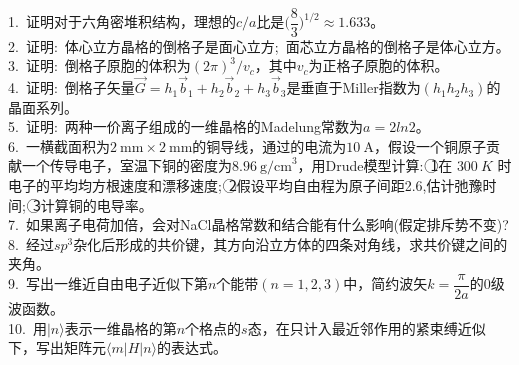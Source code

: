 \vskip 5pt
\\
1.~证明对于六角密堆积结构，理想的$c/a$比是$\bigg(\dfrac83\bigg)^{1/2}\approx1.633$。\\
2.~证明:~体心立方晶格的倒格子是面心立方;~面芯立方晶格的倒格子是体心立方。\\
3.~证明:~倒格子原胞的体积为$(2\pi)^3/v_c$，其中$v_c$为正格子原胞的体积。\\
4.~证明:~倒格子矢量$\vec G=h_1\vec b_1+h_2\vec b_2+h_3\vec b_3$是垂直于\textrm{Miller}指数为$(h_1h_2h_3)$的晶面系列。\\
5.~证明:~两种一价离子组成的一维晶格的\textrm{Madelung}常数为$a=2ln2$。\\
6.~一横截面积为$2~\mathrm{mm}\times2~\mathrm{mm}$的铜导线，通过的电流为$10~\mathrm{A}$，假设一个铜原子贡献一个传导电子，室温下铜的密度为$8.96~\mathrm{g/cm}^3$，用\textrm{Drude}模型计算:~\textcircled{1}在 $300~K$ 时电子的平均均方根速度和漂移速度;~\textcircled{2}假设平均自由程为原子间距2.6,估计弛豫时间;~\textcircled{3}计算铜的电导率。\\
7.~如果离子电荷加倍，会对\textrm{NaCl}晶格常数和结合能有什么影响(假定排斥势不变)?\\
8.~经过$sp^3$杂化后形成的共价键，其方向沿立方体的四条对角线，求共价键之间的夹角。\\
9.~写出一维近自由电子近似下第$n$个能带$(n=1,2,3)$中，简约波矢$k=\dfrac{\pi}{2a}$的0级波函数。\\
10.~用$|n\rangle$表示一维晶格的第$n$个格点的$s$态，在只计入最近邻作用的紧束缚近似下，写出矩阵元$\langle m|H|n\rangle$的表达式。
%
